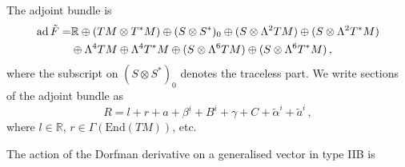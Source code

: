 \documentclass[debug]{phd}
\begin{document}
						
						The adjoint bundle is
								\begin{equation}
									\begin{split}
										\operatorname{ad} \tilde{F} = & \mathbb{R} \oplus(TM\otimes T^{*}M) \oplus(S\otimes S^{*})_0 \oplus(S\otimes\Lambda^{2}TM) \oplus(S\otimes\Lambda^{2}T^{*}M) \\
													& \oplus\Lambda^{4}TM\oplus\Lambda^{4}T^{*}M \oplus(S \otimes\Lambda^{6}TM)\oplus(S\otimes\Lambda^{6}T^{*}M) \, ,
									\end{split}
								\end{equation}
						where the subscript on $(S\otimes S^*)_0$ denotes the traceless part. 
						We write sections of the adjoint bundle as
								\begin{equation}\label{eq:IIB-adj}
									R=l+r+a+\beta^{i}+B^{i}+\gamma+C+\tilde{\alpha}^{i}+\tilde{a}^{i} \, ,
								\end{equation}
						where $l\in\mathbb{R}$, $r\in\Gamma(\mathrm{End}(TM))$, etc. 
%						
						
												

				The action of the Dorfman derivative on a generalised vector in type IIB is 
						
\end{document}

